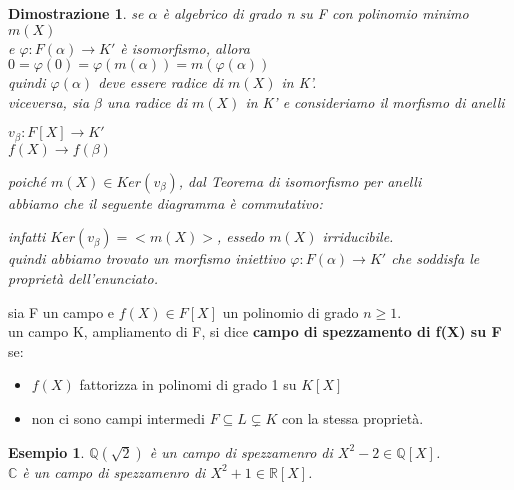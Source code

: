 \documentclass[a4paper,12pt]{article}
\theoremstyle{def}
\theoremstyle{prop}
\theoremstyle{esempio}
\newtheorem*{example}{Esempio}
\theoremstyle{dimostrazione}
\newtheorem*{dimostrazione}{Dimostrazione}
\theoremstyle{teo}
\theoremstyle{osservazione}
\begin{document}
\begin{dimostrazione}
    se \(\alpha\) è algebrico di grado n su F con polinomio minimo \(m(X)\)\\
    e \(\varphi : F(\alpha) \rightarrow K'\) è isomorfismo, allora \(0 = \varphi(0) = \varphi(m(\alpha)) = m(\varphi(\alpha))\)\\
    quindi \(\varphi(\alpha)\) deve essere radice di \(m(X)\) in K'.\\
    viceversa, sia \(\beta\) una radice di \(m(X)\) in K' e consideriamo il morfismo di anelli\\
    \begin{center}
        \(v_\beta : F[X] \rightarrow K'\)\\
        \(f(X) \rightarrow f(\beta)\)
    \end{center}
    poiché \(m(X) \in Ker(v_\beta)\), dal Teorema di isomorfismo per anelli\\
    abbiamo che il seguente diagramma è commutativo:\\
    \begin{center}
    \end{center}
    infatti \(Ker(v_\beta) = <m(X)>\), essedo \(m(X)\) irriducibile.\\
    quindi abbiamo trovato un morfismo iniettivo \(\varphi : F(\alpha) \rightarrow K'\) che soddisfa le proprietà dell'enunciato.\\
\end{dimostrazione}

sia F un campo e \(f(X) \in F[X]\) un polinomio di grado \(n \geq 1\).\\
un campo K, ampliamento di F, si dice \textbf{campo di spezzamento di f(X) su F} se:\\  
\begin{itemize}
    \item \(f(X)\) fattorizza in polinomi di grado 1 su \(K[X]\)
    \item non ci sono campi intermedi \(F \subseteq L \subsetneq K\) con la stessa proprietà.
\end{itemize}

\begin{example}
    \(\mathbb{Q}(\sqrt{2})\) è un campo di spezzamenro di \(X^2 - 2 \in \mathbb{Q}[X]\).\\
    \(\mathbb{C}\) è un campo di spezzamenro di \(X^2 + 1 \in \mathbb{R}[X]\).\\
\end{example}
\end{document}
